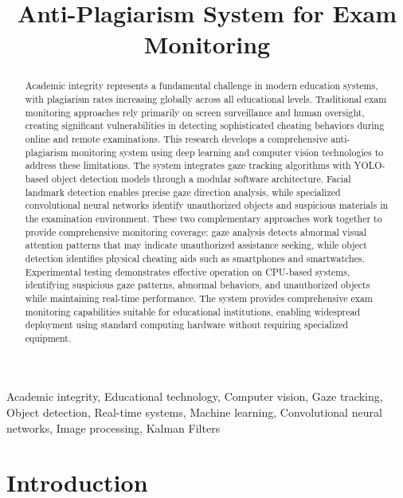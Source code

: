 \documentclass[conference]{IEEEtran}
\title{Anti-Plagiarism System for Exam Monitoring}
\author{
    \IEEEauthorblockN{Valentin Pletea-Marinescu}
    \IEEEauthorblockA{
        \textit{National University of Science and Technology POLITEHNICA Bucharest}\\
        Email: \texttt{pletea.valentin2003@gmail.com}
    }
}
\begin{document}
\maketitle

\begin{abstract}
Academic integrity represents a fundamental challenge in modern education systems, 
with plagiarism rates increasing globally across all educational levels. Traditional 
exam monitoring approaches rely primarily on screen surveillance and human oversight, 
creating significant vulnerabilities in detecting sophisticated cheating behaviors 
during online and remote examinations.
This research develops a comprehensive anti-plagiarism monitoring system using 
deep learning and computer vision technologies to address these limitations. 
The system integrates gaze tracking algorithms with YOLO-based object detection 
models through a modular software architecture. Facial landmark detection enables 
precise gaze direction analysis, while specialized convolutional neural networks 
identify unauthorized objects and suspicious materials in the examination environment. 
These two complementary approaches work together to provide comprehensive monitoring 
coverage: gaze analysis detects abnormal visual attention patterns that may indicate 
unauthorized assistance seeking, while object detection identifies physical cheating 
aids such as smartphones and smartwatches.
Experimental testing demonstrates effective operation on CPU-based 
systems, identifying suspicious gaze patterns, abnormal behaviors, 
and unauthorized objects while maintaining real-time performance. The system provides 
comprehensive exam monitoring capabilities suitable for educational institutions, enabling 
widespread deployment using standard computing hardware without requiring specialized equipment.
\end{abstract}

\begin{IEEEkeywords}
Academic integrity, Educational technology, Computer vision, Gaze tracking, Object detection, Real-time systems, Machine learning, Convolutional neural networks, Image processing, Kalman Filters
\end{IEEEkeywords}

\section{Introduction}
\end{document}
